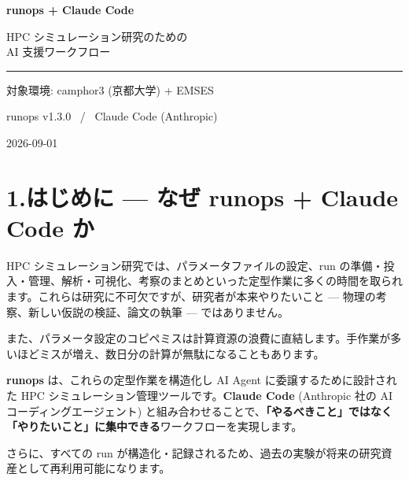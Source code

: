 \documentclass[a4paper,11pt]{article}
\begin{document}
\thispagestyle{empty}
\vspace*{5cm}

\begin{center}
{\Huge\bfseries\color{darkblue} runops + Claude Code}

\vspace{1cm}

{\Large\color{accent} HPC シミュレーション研究のための\\[4pt] AI 支援ワークフロー}

\vspace{2cm}

{\color{accent}\rule{8cm}{0.5pt}}

\vspace{1.5cm}

{\large 対象環境: camphor3 (京都大学) + EMSES}

\medskip

runops v1.3.0 ~/~ Claude Code (Anthropic)

\vspace{4cm}

{\small\color{gray} 2026-09-01}
\end{center}

\newpage

\section*{\color{darkblue} 1.\quad はじめに --- なぜ runops + Claude Code か}

HPC シミュレーション研究では、パラメータファイルの設定、run の準備・投入・管理、解析・可視化、考察のまとめといった定型作業に多くの時間を取られます。これらは研究に不可欠ですが、研究者が本来やりたいこと --- 物理の考察、新しい仮説の検証、論文の執筆 --- ではありません。

また、パラメータ設定のコピペミスは計算資源の浪費に直結します。手作業が多いほどミスが増え、数日分の計算が無駄になることもあります。

\textbf{runops} は、これらの定型作業を構造化し AI Agent に委譲するために設計された HPC シミュレーション管理ツールです。\textbf{Claude Code} (Anthropic 社の AI コーディングエージェント) と組み合わせることで、\textbf{「やるべきこと」ではなく「やりたいこと」に集中できる}ワークフローを実現します。

さらに、すべての run が構造化・記録されるため、過去の実験が将来の研究資産として再利用可能になります。
\end{document}
